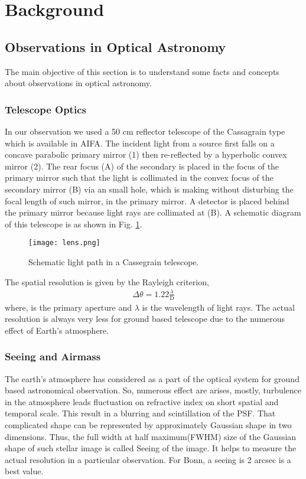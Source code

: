 \section{Background}
\subsection{Observations in Optical Astronomy}
The main objective of this section is to understand some facts and concepts about observations in optical astronomy.

\subsubsection{Telescope Optics}
In our observation we used a 50 cm reflector telescope of the Cassagrain type which is available in AIFA. The incident light from a source first falls on a concave parabolic primary mirror (1) then re-reflected by a hyperbolic convex mirror (2). The rear focus (A) of the secondary is placed in the focus of the primary mirror such that the light is collimated in the convex focus of the secondary mirror (B) via an small hole, which is making without disturbing the focal length of such mirror, in the primary mirror. A detector is placed behind the primary mirror because light rays are collimated at (B). A schematic diagram of this telescope is as shown in Fig. \ref{Fig:telescope}.
\begin{figure}[H]
	\centering
	\texttt{[image: lens.png]}
	\caption{Schematic light path in a Cassegrain telescope\cite{manual}.}%
	\label{Fig:telescope}	
\end{figure}

The spatial resolution is given by the Rayleigh criterion,
\begin{eqnarray}
\Delta\theta = 1.22 \frac{\lambda}{\text{D}}
\end{eqnarray}
\noindent
where,  is the primary aperture and $ \lambda $ is the wavelength of light rays. The actual resolution is always very less for ground based telescope due to the numerous effect of Earth's atmosphere. \\

\subsubsection{Seeing and Airmass}
The earth's atmosphere has considered as a part of the optical system for ground based astronomical observation. So, numerous effect are arises, mostly, turbulence in the atmosphere leads fluctuation on refractive index on short spatial and temporal scale. This result in a blurring and scintillation of the PSF. That complicated shape can be represented by approximately Gaussian shape in two dimensions. Thus, the full width at half maximum(FWHM) size of the Gaussian shape of such stellar image is called Seeing of the image. It helps to measure the actual resolution in a particular observation. For Bonn, a seeing is 2 arcsec is a best value.\\

